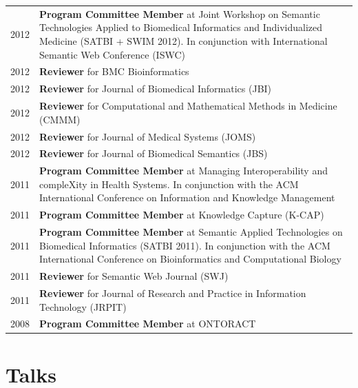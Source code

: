 \documentclass[11pt,fullpage]{article}
\begin{document}
\begin{longtable}{p{0.5in}|p{5.5in}}
2012 & \textbf{Program Committee Member} at Joint Workshop on Semantic Technologies Applied to Biomedical Informatics and Individualized Medicine (SATBI + SWIM 2012). In conjunction with International Semantic Web Conference (ISWC)\\
2012 & \textbf{Reviewer} for BMC Bioinformatics \\
2012 & \textbf{Reviewer} for Journal of Biomedical Informatics (JBI) \\
2012 & \textbf{Reviewer} for Computational and Mathematical Methods in Medicine (CMMM) \\
2012 & \textbf{Reviewer} for Journal of Medical Systems (JOMS) \\
2012 & \textbf{Reviewer} for Journal of Biomedical Semantics (JBS) \\
2011 & \textbf{Program Committee Member} at Managing Interoperability and compleXity in Health Systems. In conjunction with the ACM International Conference on Information and Knowledge Management\\
2011 & \textbf{Program Committee Member} at Knowledge Capture (K-CAP)\\
2011 & \textbf{Program Committee Member} at Semantic Applied Technologies on Biomedical Informatics (SATBI 2011). In conjunction with the ACM International Conference on Bioinformatics and Computational Biology\\
2011 & \textbf{Reviewer} for Semantic Web Journal (SWJ) \\
2011 & \textbf{Reviewer} for Journal of Research and Practice in Information Technology (JRPIT)\\
2008 & \textbf{Program Committee Member} at ONTORACT \\

\end{longtable}


\section*{Talks}
\end{document}
